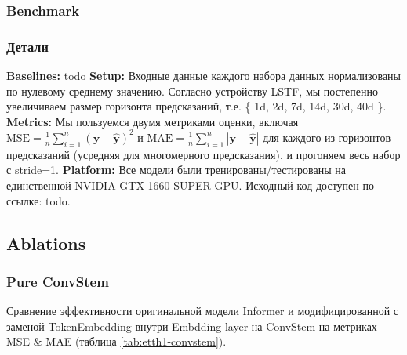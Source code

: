 
\subsubsection{Benchmark}


\subsubsection{Детали}

\textbf{Baselines:} {\color{red} todo}
\textbf{Setup:} Входные данные каждого набора данных нормализованы по нулевому среднему значению. 
Согласно устройству LSTF, мы постепенно увеличиваем размер горизонта предсказаний, 
т.е. \{ 1d, 2d, 7d, 14d, 30d, 40d \}.
\textbf{Metrics:} Мы пользуемся двумя метриками оценки, включая 
$\text{MSE}=\frac{1}{n} \sum_{i=1}^n (\bm{y} - \hat{\bm{y}})^2$ 
и $\text{MAE}=\frac{1}{n} \sum_{i=1}^n |\bm{y} - \hat{\bm{y}}|$ 
для каждого из горизонтов предсказаний (усредняя для многомерного 
предсказания), и прогоняем весь набор с stride=1.
\textbf{Platform:}
Все модели были тренированы/тестированы на единственной 
NVIDIA GTX 1660 SUPER GPU. Исходный код доступен 
по ссылке: {\color{red} todo}.

\subsection{Ablations}

\subsubsection{Pure ConvStem}

Сравнение эффективности оригинальной модели Informer и модифицированной
с заменой TokenEmbedding внутри Embdding layer на ConvStem 
на метриках MSE \& MAE (таблица \ref{tab:etth1-convstem}).

